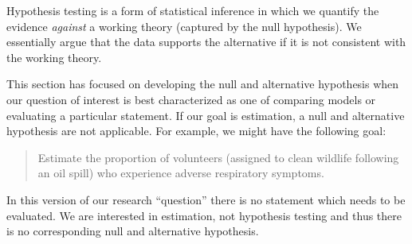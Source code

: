 \documentclass[
  letterpaper,
  DIV=11,
  numbers=noendperiod]{scrreprt}
\theoremstyle{plain}
\theoremstyle{definition}
\theoremstyle{definition}
\theoremstyle{remark}
\begin{document}
\begin{tcolorbox}[enhanced jigsaw, breakable, titlerule=0mm, colframe=quarto-callout-tip-color-frame, bottomtitle=1mm, opacityback=0, rightrule=.15mm, toptitle=1mm, arc=.35mm, bottomrule=.15mm, left=2mm, title=\textcolor{quarto-callout-tip-color}{\faLightbulb}\hspace{0.5em}{Big Idea}, leftrule=.75mm, coltitle=black, toprule=.15mm, colbacktitle=quarto-callout-tip-color!10!white, colback=white, opacitybacktitle=0.6]

Hypothesis testing is a form of statistical inference in which we
quantify the evidence \emph{against} a working theory (captured by the
null hypothesis). We essentially argue that the data supports the
alternative if it is not consistent with the working theory.

\end{tcolorbox}

This section has focused on developing the null and alternative
hypothesis when our question of interest is best characterized as one of
comparing models or evaluating a particular statement. If our goal is
estimation, a null and alternative hypothesis are not applicable. For
example, we might have the following goal:

\begin{quote}
Estimate the proportion of volunteers (assigned to clean wildlife
following an oil spill) who experience adverse respiratory symptoms.
\end{quote}

In this version of our research ``question'' there is no statement which
needs to be evaluated. We are interested in estimation, not hypothesis
testing and thus there is no corresponding null and alternative
hypothesis.
\end{document}
